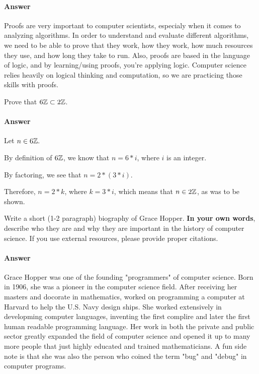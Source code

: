 \documentclass{article}
\begin{document}
\paragraph{Answer}

Proofs are very important to computer scientists, especialy when it comes to analyzing algorithms. In order to understand and evaluate different algorithms, we need to be able to prove that they work, how they work, how much resources they use, and how long they take to run. Also, proofs are based in the language of logic, and by learning/using proofs, you're applying logic. Computer science relies heavily on logical thinking and computation, so we are practicing those skills with proofs.



Prove that $6{\mathbb Z} \subset 2{\mathbb Z}$.

\paragraph{Answer}

Let $n \in 6{\mathbb Z}.$ 

By definition of $6{\mathbb Z}$, we know that $n= 6*i$, where $i$ is an integer.

By factoring, we see that $n=2 * (3 * i)$.

Therefore, $n=2*k$, where $k=3*i$, which means that $n \in 2{\mathbb Z}$, as was to be shown.



Write a short (1-2 paragraph) biography of Grace Hopper.
\textbf{In your own words}, describe who they are and why they are important in
the history of computer science.  If you use external resources, please provide
proper citations.

\paragraph{Answer}

Grace Hopper was one of the founding "programmers" of computer science. Born in 1906, she was a pioneer in the computer science field. After receiving her masters and docorate in mathematics, worked on programming a computer at Harvard to help the U.S. Navy design ships. She worked extensively in developming computer languages, inventing the first complire and later the first human readable programming language. Her work in both the private and public sector greatly expanded the field of computer science and opened it up to many more people that just highly educated and trained mathematicians. A fun side note is that she was also the person who coined the term "bug" and "debug" in computer programs.
\end{document}
